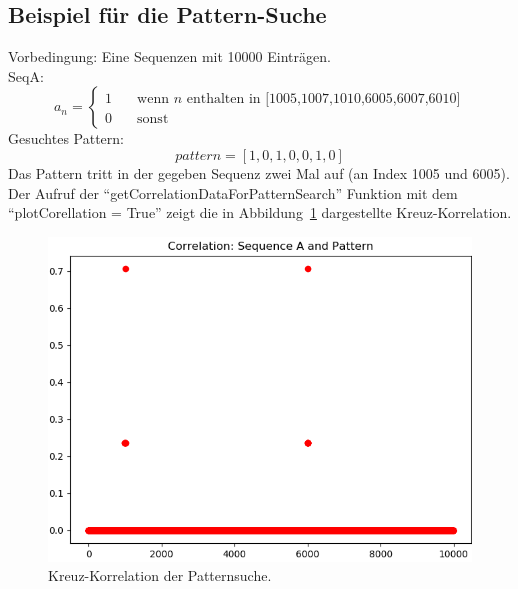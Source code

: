 \subsection{Beispiel für die Pattern-Suche}
Vorbedingung: Eine Sequenzen mit 10000 Einträgen. \\
SeqA:
\[ a_{n} =
  \begin{cases}
    1       & \quad \text{wenn } n \text{ enthalten in [1005,1007,1010,6005,6007,6010]}\\
    0  & \quad \text{sonst}
  \end{cases}
\]
Gesuchtes Pattern:
\[
pattern = [1,0,1,0,0,1,0] 
\]
Das Pattern tritt in der gegeben Sequenz zwei Mal auf (an Index 1005 und 6005).
Der Aufruf der \enquote{getCorrelationDataForPatternSearch} Funktion mit dem \enquote{plotCorellation = True} zeigt die in Abbildung~\ref{fig:patternsearchCorrelation} dargestellte Kreuz-Korrelation.

\begin{figure}[H]
  \includegraphics[width=\linewidth]{./images/patternsearchCorrelation.PNG}
  \caption[Patternsuche: Kreuz-Korrelation]{Kreuz-Korrelation der Patternsuche\footnotemark.}
  \label{fig:patternsearchCorrelation}
\end{figure}

